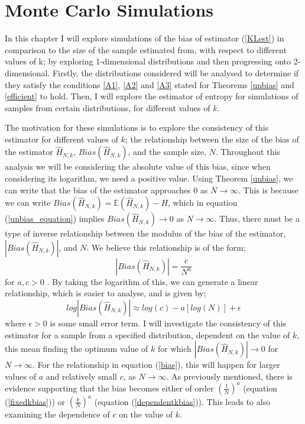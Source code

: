\documentclass{report}
\begin{document}
\chapter{Monte Carlo Simulations}

In this chapter I will explore simulations of the bias of estimator (\ref{KLest}) in comparison to the size of the sample estimated from, with respect to different values of k; by exploring 1-dimensional distributions and then progressing onto 2-dimensional. Firstly, the distributions considered will be analysed to determine if they satisfy the conditions \ref{A1}, \ref{A2} and \ref{A3} stated for Theorems \ref{unbias} and \ref{efficient} to hold. Then, I will explore the estimator of entropy for simulations of samples from certain distributions, for different values of $k$.

The motivation for these simulations is to explore the consistency of this estimator for different values of $k$; the relationship between the size of the bias of the estimator $\hat{H}_{N, k}$, $Bias(\hat{H}_{N, k})$,  and the sample size, $N$. Throughout this analysis we will be considering the absolute value of this bias, since when considering its logarithm, we need a positive value. Using Theorem \ref{unbias}, we can write that the bias of the estimator approaches 0 as $N \to \infty$. This is because we can write $Bias(\hat{H}_{N, k} ) = \mathbb{E}(\hat{H}_{N, k}) - H$, which in equation (\ref{unbias_equation}) implies $Bias(\hat{H}_{N, k}) \to 0$ as $N \to \infty$. Thus, there must be a type of inverse relationship between the modulus of the bias of the estimator, $|Bias(\hat{H}_{N, k})|$, and $N$. We believe this relationship is of the form;
\begin{equation} \label{bias}
|Bias(\hat{H}_{N, k})| = \frac{c}{N^a}
\end{equation}
for $a, c > 0$ \cite{paper3, paper4}. By taking the logarithm of this, we can generate a linear relationship, which is easier to analyse, and is given by;
\begin{equation} \label{logbias}
log|Bias(\hat{H}_{N, k})| \approx log(c) - a [log(N)] + \epsilon
\end{equation}
where $\epsilon > 0$ is some small error term. I will investigate the consistency of this estimator for a sample from a specified distribution, dependent on the value of $k$, this mean finding the optimum value of $k$ for which $|Bias(\hat{H}_{N, k})| \to 0$ for $N \to \infty$. For the relationship in equation (\ref{bias}), this will happen for larger values of $a$ and relatively small $c$, as $N \to \infty$. As previously mentioned, there is evidence supporting that the bias becomes either of order $(\frac{1}{N})^a$ (equation (\ref{fixedkbias})) or $(\frac{k}{N})^a$ (equation (\ref{dependentkbias})). This leads to also examining the dependence of $c$ on the value of $k$. 
\end{document}
